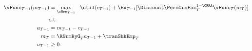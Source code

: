 \begin{equation*}\begin{gathered}\begin{aligned}
{\vFunc}_{T-1}(m_{T-1})  & = \max_{\cNrm_{T-1}} ~~ \util(c_{T-1}) + \Ex_{T-1} [\Discount \PermGroFac_{T}^{1-\CRRA}\vFunc_{T}(m_{T})] \label{eq:ConstrArt}
\\ & \mbox{s.t.}  \nonumber
\\ a_{T-1}  & = m_{T-1} - c_{T-1}
\\ m_{T}  & = \RNrmByG_{T} a_{T-1} + \tranShkEmp_{T}
\\ a_{T-1} & \geq  0 .
\end{aligned}\end{gathered}\end{equation*}

